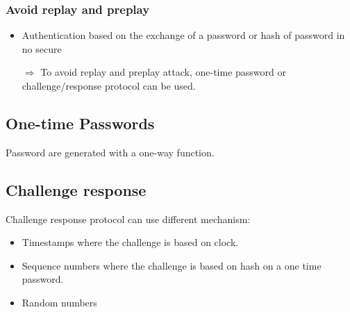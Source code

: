 \subsubsection{Avoid replay and preplay}
\begin{itemize}
    \item Authentication based on the exchange of a password or hash of
        password in no secure
    \item[$\Rightarrow$]
        To avoid replay and preplay attack, one-time password or
        challenge/response protocol can be used.
\end{itemize}


\subsection{One-time Passwords}
Password are generated with a one-way function.

\subsection{Challenge response}
Challenge response protocol can use different mechanism:
\begin{itemize}
    \item Timestamps where the challenge is based on clock.
    \item Sequence numbers where the challenge is based on hash on a
        one time password.
    \item Random numbers
\end{itemize}

